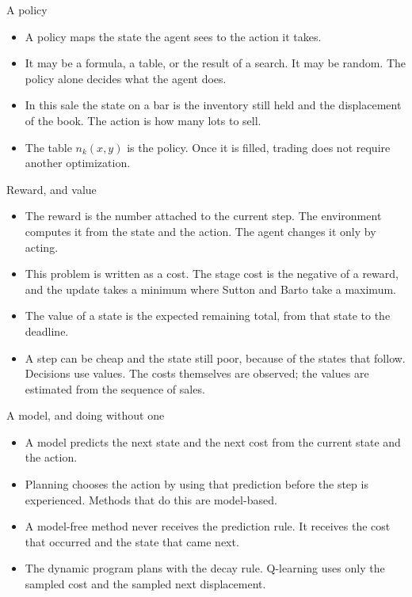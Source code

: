 \documentclass[aspectratio=169,10pt]{beamer}
\newcommand{\currentsource}{}
\newcommand{\framesource}[1]{\gdef\currentsource{#1}}
\begin{document}
\begin{frame}{A policy}
\framesource{Sutton and Barto, 2018, \S 1.3. Wording is not a quotation.}
\begin{itemize}
\item A policy maps the state the agent sees to the action it takes.
\item It may be a formula, a table, or the result of a search. It may be random. The policy alone decides what the agent does.
\item In this sale the state on a bar is the inventory still held and the displacement of the book. The action is how many lots to sell.
\item The table \(n_k(x,y)\) is the policy. Once it is filled, trading does not require another optimization.
\end{itemize}
\end{frame}

\begin{frame}{Reward, and value}
\framesource{Sutton and Barto, 2018, \S 1.3. Wording is not a quotation.}
\begin{itemize}
\item The reward is the number attached to the current step. The environment computes it from the state and the action. The agent changes it only by acting.
\item This problem is written as a cost. The stage cost is the negative of a reward, and the update takes a minimum where Sutton and Barto take a maximum.
\item The value of a state is the expected remaining total, from that state to the deadline.
\item A step can be cheap and the state still poor, because of the states that follow. Decisions use values. The costs themselves are observed; the values are estimated from the sequence of sales.
\end{itemize}
\end{frame}

\begin{frame}{A model, and doing without one}
\framesource{Sutton and Barto, 2018, \S 1.3. Wording is not a quotation.}
\begin{itemize}
\item A model predicts the next state and the next cost from the current state and the action.
\item Planning chooses the action by using that prediction before the step is experienced. Methods that do this are model-based.
\item A model-free method never receives the prediction rule. It receives the cost that occurred and the state that came next.
\item The dynamic program plans with the decay rule. Q-learning uses only the sampled cost and the sampled next displacement.
\end{itemize}
\end{frame}
\end{document}
